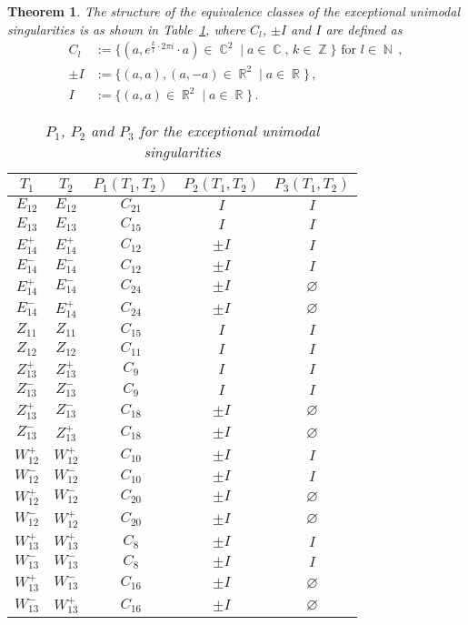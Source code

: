 \documentclass[noend]{amsproc}
\newtheorem{theorem}{Theorem}
\theoremstyle{definition}
\DeclareMathOperator{\N}{\mathbb{N}}
\DeclareMathOperator{\Z}{\mathbb{Z}}
\DeclareMathOperator{\R}{\mathbb{R}}
\DeclareMathOperator{\C}{\mathbb{C}}
\begin{document}
\begin{theorem}
The structure of the equivalence classes of the exceptional unimodal
singularities is as shown in Table~\ref{tab:exceptional_equivalences}, where
$C_l$, $\pm I$ and $I$ are defined as
\begin{align*}
C_l
&:= \{ (a, e^{\frac{k}{l} \cdot 2 \pi i} \cdot a) \in \C^2
\mid a \in \C,\, k \in \Z \} \text{ for } l \in \N \,, \\
\pm I
&:= \{ (a, a), (a, -a) \in \R^2 \mid a \in \R\} \,, \\
I
&:= \{ (a, a) \in \R^2 \mid a \in \R\} \,.
\end{align*}

\begin{table}[!htb]
\centering
\caption{$P_1$, $P_2$ and $P_3$ for the exceptional unimodal singularities}
\label{tab:exceptional_equivalences}
\begin{tabular}{|c|c||c|c|c|}
\hline
$T_1$ & $T_2$ & $P_1(T_1, T_2)$ & $P_2(T_1, T_2)$ & $P_3(T_1, T_2)$ \\
\hline\hline
$E_{12}$ & $E_{12}$ & $C_{21}$ & $I$ & $I$ \\
\hline
$E_{13}$ & $E_{13}$ & $C_{15}$ & $I$ & $I$ \\
\hline
$E_{14}^+$ & $E_{14}^+$ & $C_{12}$ & $\pm I$ & $I$ \\
\hline
$E_{14}^-$ & $E_{14}^-$ & $C_{12}$ & $\pm I$ & $I$ \\
\hline
$E_{14}^+$ & $E_{14}^-$ & $C_{24}$ & $\pm I$ & $\varnothing$ \\
\hline
$E_{14}^-$ & $E_{14}^+$ & $C_{24}$ & $\pm I$ & $\varnothing$ \\
\hline
$Z_{11}$ & $Z_{11}$ & $C_{15}$ & $I$ & $I$ \\
\hline
$Z_{12}$ & $Z_{12}$ & $C_{11}$ & $I$ & $I$ \\
\hline
$Z_{13}^+$ & $Z_{13}^+$ & $C_{9}$ & $I$ & $I$ \\
\hline
$Z_{13}^-$ & $Z_{13}^-$ & $C_{9}$ & $I$ & $I$ \\
\hline
$Z_{13}^+$ & $Z_{13}^-$ & $C_{18}$ & $\pm I$ & $\varnothing$ \\
\hline
$Z_{13}^-$ & $Z_{13}^+$ & $C_{18}$ & $\pm I$ & $\varnothing$ \\
\hline
$W_{12}^+$ & $W_{12}^+$ & $C_{10}$ & $\pm I$ & $I$ \\
\hline
$W_{12}^-$ & $W_{12}^-$ & $C_{10}$ & $\pm I$ & $I$ \\
\hline
$W_{12}^+$ & $W_{12}^-$ & $C_{20}$ & $\pm I$ & $\varnothing$ \\
\hline
$W_{12}^-$ & $W_{12}^+$ & $C_{20}$ & $\pm I$ & $\varnothing$ \\
\hline
$W_{13}^+$ & $W_{13}^+$ & $C_{8}$ & $\pm I$ & $I$ \\
\hline
$W_{13}^-$ & $W_{13}^-$ & $C_{8}$ & $\pm I$ & $I$ \\
\hline
$W_{13}^+$ & $W_{13}^-$ & $C_{16}$ & $\pm I$ & $\varnothing$ \\
\hline
$W_{13}^-$ & $W_{13}^+$ & $C_{16}$ & $\pm I$ & $\varnothing$ \\
\hline
\end{tabular}
\end{table}

\end{theorem}
\end{document}
